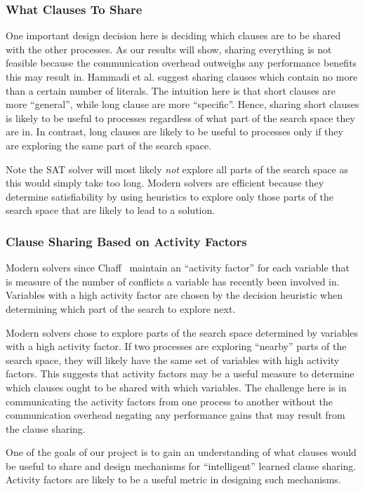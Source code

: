 \documentclass[letterpaper, compsoc, conference]{IEEEtran}
\begin{document}
\subsubsection{What Clauses To Share}

One important design decision here is deciding which clauses are to be shared
with the other processes. As our results will show, sharing everything is not
feasible because the communication overhead outweighs any performance benefits
this may result in. Hammadi et al. \cite{Hammadi} suggest sharing clauses which
contain no more than a certain number of literals. The intuition here is that
short clauses are more ``general'', while long clause are more ``specific''.
Hence, sharing short clauses is likely to be useful to processes regardless of
what part of the search space they are in. In contrast, long clauses are likely
to be useful to processes only if they are exploring the same part of the
search space. 

Note the SAT solver will most likely \textit{not} explore all parts of the
search space as this would simply take too long. Modern solvers are efficient
because they determine satisfiability by using heuristics to explore only
those parts of the search space that are likely to lead to a solution.

\subsubsection{Clause Sharing Based on Activity Factors}
Modern solvers since Chaff~\cite{CHAFF} maintain an ``activity factor'' for
each variable that is measure of the number of conflicts a variable has
recently been involved in. Variables with a high activity factor are chosen
by the decision heuristic when determining which part of the search to explore
next. 

Modern solvers chose to explore parts of the search space determined by
variables with a high activity factor.  If two processes are exploring
``nearby'' parts of the search space, they will likely have the same set of
variables with high activity factors. This suggests that activity factors may
be a useful measure to determine which clauses ought to be shared with which
variables. The challenge here is in communicating the activity factors from one
process to another without the communication overhead negating any performance
gains that may result from the clause sharing.

One of the goals of our project is to gain an understanding of what clauses
would be useful to share and design mechanisms for ``intelligent'' learned
clause sharing.  Activity factors are likely to be a useful metric in designing
such mechanisms.
\end{document}
